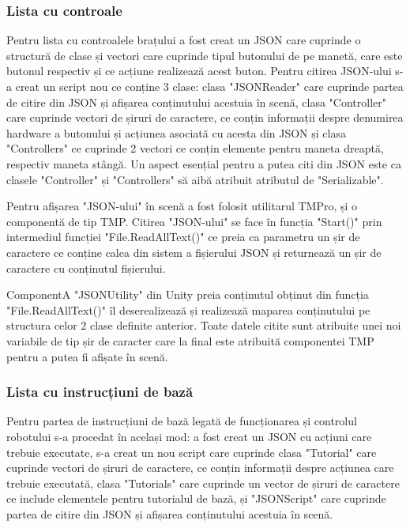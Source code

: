 \subsubsection{Lista cu controale}

Pentru lista cu controalele brațului a fost creat un JSON care cuprinde o structură de clase și vectori care cuprinde tipul butonului de pe manetă, care este butonul respectiv și ce acțiune realizează acest buton. Pentru citirea JSON-ului s-a creat un script nou ce conține 3 clase: clasa  "JSONReader" care cuprinde partea de citire din JSON și afișarea conținutului acestuia în scenă, clasa "Controller" care cuprinde vectori de șiruri de caractere, ce conțin informații despre denumirea hardware a butonului și acțiunea asociată cu acesta din JSON și clasa "Controllers" ce cuprinde 2 vectori ce conțin elemente pentru maneta dreaptă, respectiv maneta stângă. Un aspect esențial pentru a putea citi din JSON este ca clasele "Controller" și "Controllers" să aibă atribuit atributul de "Serializable".

Pentru afișarea "JSON-ului" în scenă a fost folosit utilitarul TMPro, și o componentă de tip TMP.
Citirea "JSON-ului" se face în funcția "Start()" prin intermediul funcției "File.ReadAllText()" ce preia  ca parametru un șir de caractere ce conține calea din sistem a fișierului JSON și returnează un șir de caractere cu conținutul fișierului.

 ComponentA "JSONUtility" din Unity preia conținutul obținut din funcția  "File.ReadAllText()" îl deserealizează și realizează maparea conținutului pe structura celor 2 clase definite anterior. Toate datele citite sunt atribuite unei noi variabile de tip șir de caracter care la final este atribuită componentei TMP pentru a putea fi afișate în scenă.
 
 \subsubsection{Lista cu instrucțiuni de bază}
 Pentru partea de instrucțiuni de bază legată de funcționarea și controlul robotului s-a procedat în același mod: a fost creat un JSON cu acțiuni care trebuie executate, s-a creat un nou script care cuprinde clasa "Tutorial" care cuprinde vectori de șiruri de caractere, ce conțin informații despre acțiunea care trebuie executată, clasa "Tutorials" care cuprinde un vector de șiruri de caractere ce include elementele pentru tutorialul de bază, și "JSONScript" care cuprinde partea de citire din JSON și afișarea conținutului acestuia în scenă.
 
